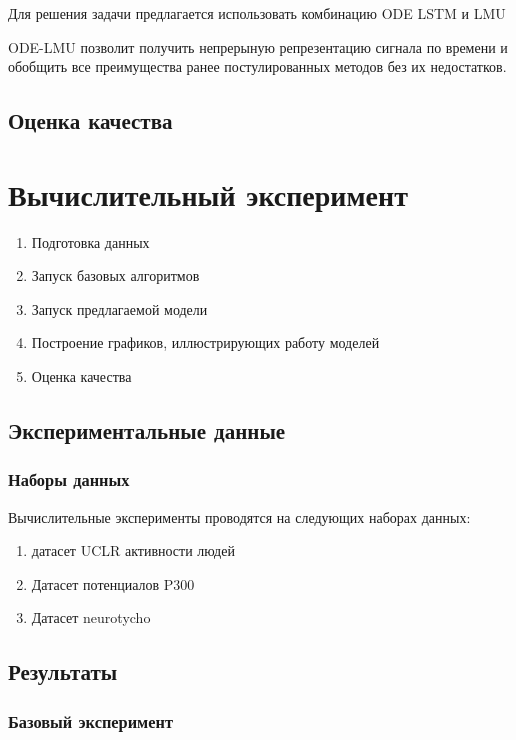 \documentclass[12pt]{article}
\begin{document}
Для решения задачи предлагается использовать комбинацию ODE LSTM и LMU

ODE-LMU позволит получить непрерыную репрезентацию сигнала по времени и обобщить все преимущества ранее постулированных методов без их недостатков.



\subsection{Оценка качества}




\newpage
\section{Вычислительный эксперимент}
\begin{enumerate}
    \item Подготовка данных
    \item Запуск базовых алгоритмов
    \item Запуск предлагаемой модели
    \item Построение графиков, иллюстрирующих работу моделей
    \item Оценка качества
\end{enumerate}

\subsection{Экспериментальные данные}
\subsubsection{Наборы данных}
Вычислительные эксперименты проводятся на следующих наборах данных:
\begin{enumerate}
    \item датасет UCLR активности людей
    \item Датасет потенциалов P300
    \item Датасет neurotycho

\end{enumerate}

\subsection{Результаты}
\subsubsection{Базовый эксперимент}
\end{document}
